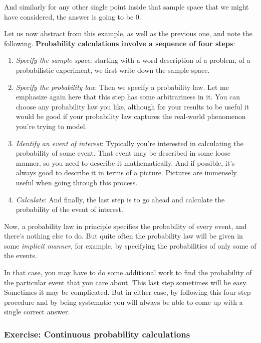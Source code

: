 \documentclass[pdftex, brazil, 12pt, twoside]{article}
\begin{document}
And similarly for any other single point inside that
sample space that we might have considered, the answer is
going to be 0.

Let us now abstract from this example, as well as the
previous one, and note the following.
\textbf{Probability calculations involve a
  sequence of four steps}:

\begin{enumerate}
\item \emph{Specify the sample space}: starting with a word description of a problem, of a
  probabilistic experiment, we first write
  down the sample space.
\item \emph{Specify the probability law}: Then we specify a probability law.
  Let me emphasize again here that this step has some
  arbitrariness in it. You can choose any probability law you like, although for
  your results to be useful it would be good if your
  probability law captures the real-world phenomenon you're
  trying to model.
\item \emph{Identify an event of interest}: Typically you're interested in calculating the probability of
  some event. That event may be described in some loose manner, so you need
  to describe it mathematically. And if possible, it's always good to describe it in terms
  of a picture. Pictures are immensely useful when going through this process.
\item \emph{Calculate}: And finally, the last step is to go ahead and calculate the
  probability of the event of interest.
\end{enumerate}

Now, a probability law in principle specifies the
probability of every event, and there's
nothing else to do.
But quite often the probability law will be given
in some \emph{implicit manner}, for example, by specifying the
probabilities of only some of the events.

In that case, you may have to do some additional work to
find the probability of the particular event
that you care about.
This last step sometimes will be easy.
Sometimes it may be complicated.
But in either case, by following this four-step
procedure and by being systematic you will always be
able to come up with a single correct answer.

\subsubsection{Exercise: Continuous probability calculations}
\label{un1-lec1-exec-continuous-probability}
\end{document}
